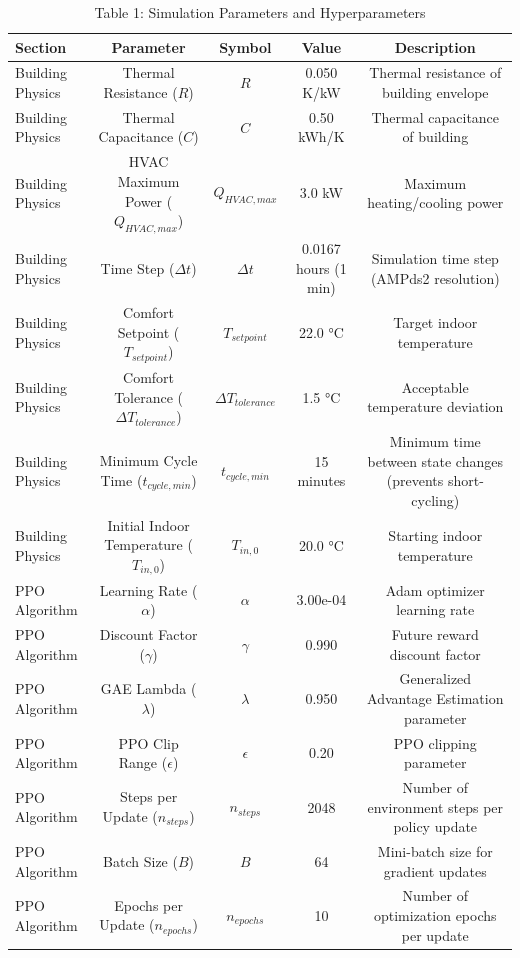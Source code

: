 \begin{table}[h]
\centering
\caption{Table 1: Simulation Parameters and Hyperparameters}
\label{tab:parameters}
\begin{tabular}{lcccc}
\toprule
Section & Parameter & Symbol & Value & Description \\
\midrule
Building Physics & Thermal Resistance ($R$) & $R$ & 0.050 K/kW & Thermal resistance of building envelope \\
Building Physics & Thermal Capacitance ($C$) & $C$ & 0.50 kWh/K & Thermal capacitance of building \\
Building Physics & HVAC Maximum Power ($Q_{HVAC,max}$) & $Q_{HVAC,max}$ & 3.0 kW & Maximum heating/cooling power \\
Building Physics & Time Step ($\Delta t$) & $\Delta t$ & 0.0167 hours (1 min) & Simulation time step (AMPds2 resolution) \\
Building Physics & Comfort Setpoint ($T_{setpoint}$) & $T_{setpoint}$ & 22.0 °C & Target indoor temperature \\
Building Physics & Comfort Tolerance ($\Delta T_{tolerance}$) & $\Delta T_{tolerance}$ & 1.5 °C & Acceptable temperature deviation \\
Building Physics & Minimum Cycle Time ($t_{cycle,min}$) & $t_{cycle,min}$ & 15 minutes & Minimum time between state changes (prevents short-cycling) \\
Building Physics & Initial Indoor Temperature ($T_{in,0}$) & $T_{in,0}$ & 20.0 °C & Starting indoor temperature \\
PPO Algorithm & Learning Rate ($\alpha$) & $\alpha$ & 3.00e-04 & Adam optimizer learning rate \\
PPO Algorithm & Discount Factor ($\gamma$) & $\gamma$ & 0.990 & Future reward discount factor \\
PPO Algorithm & GAE Lambda ($\lambda$) & $\lambda$ & 0.950 & Generalized Advantage Estimation parameter \\
PPO Algorithm & PPO Clip Range ($\epsilon$) & $\epsilon$ & 0.20 & PPO clipping parameter \\
PPO Algorithm & Steps per Update ($n_{steps}$) & $n_{steps}$ & 2048 & Number of environment steps per policy update \\
PPO Algorithm & Batch Size ($B$) & $B$ & 64 & Mini-batch size for gradient updates \\
PPO Algorithm & Epochs per Update ($n_{epochs}$) & $n_{epochs}$ & 10 & Number of optimization epochs per update \\

\end{tabular}
\end{table}
